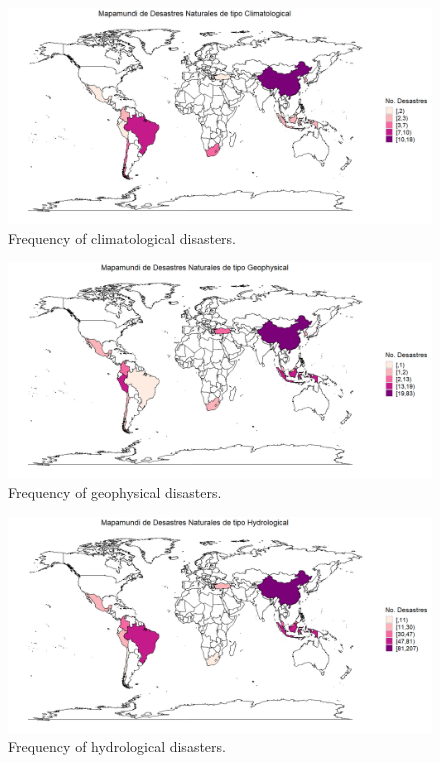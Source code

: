 \documentclass{article}
\begin{document}
\begin{figure}[H]
    \centering
    \includegraphics[width=\textwidth]{Imagenes/climatological.png}
    \caption{Frequency of climatological disasters.}
    \label{fig:climatological}
\end{figure}
\begin{figure}[H]
    \centering
    \includegraphics[width=\textwidth]{Imagenes/geophyisical.png}
    \caption{Frequency of geophysical disasters.}
    \label{fig:geophysical}
\end{figure}
\begin{figure}[H]
    \centering
    \includegraphics[width=\textwidth]{Imagenes/Hydrological.png}
    \caption{Frequency of hydrological disasters.}
    \label{fig:hydrological}
\end{figure}
\end{document}
